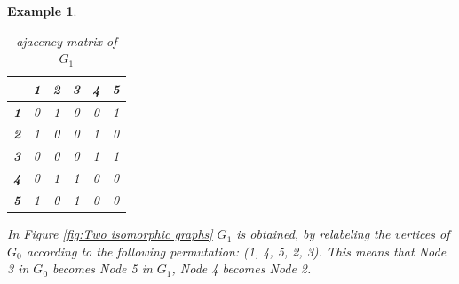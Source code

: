 \documentclass[12pt,a4paper]{article}
\newtheorem{exa}[thm]{Example}
\begin{document}
\begin{exa}
\begin{table}[!htb]
\begin{minipage}{.5\linewidth}
		\begin{tabular}{|c|c|c|c|c|c|}
			\hline 
			& \textbf{1} & \textbf{2} & \textbf{3} & \textbf{4} & \textbf{5} \\ 
			\hline 
			\textbf{1} & 0 & 1 & 0 & 0 & 1 \\ 
			\hline 
			\textbf{2} & 1 & 0 & 0 & 1 & 0 \\ 
			\hline 
			\textbf{3} & 0 & 0 & 0 & 1 & 1 \\ 
			\hline 
			\textbf{4} & 0 & 1 & 1 & 0 & 0 \\ 
			\hline 
			\textbf{5} & 1 & 0 & 1 & 0 & 0 \\ 
			\hline 
		\end{tabular}
			\caption{ajacency matrix of $G_1$}
	\end{minipage} 
\end{table}

In Figure \ref{fig:Two isomorphic graphs} $G_1$ is obtained, by relabeling the vertices of $G_0$ according to the following permutation: (1, 4, 5, 2, 3). This means that Node 3 in $G_0$ becomes Node 5 in $G_1$, Node 4 becomes Node 2. 
\end{exa}
\end{document}
